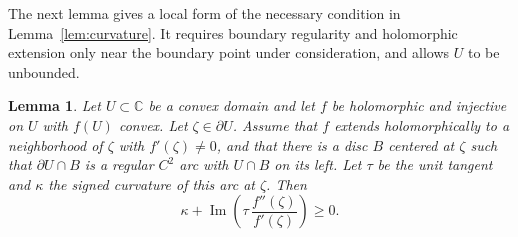\documentclass[a4paper, reqno, 11pt]{amsart}
\newtheorem{Lem}[Thm]{Lemma}
\theoremstyle{definition}
\begin{document}
The next lemma gives a local form of the necessary condition in Lemma~\ref{lem:curvature}. 
It requires boundary regularity and holomorphic extension only near the boundary point under consideration, and allows $U$ to be unbounded.

\begin{Lem}\label{lem:local}
Let $U \subset \mathbb{C}$ be a convex domain and let $f$ be holomorphic and injective on $U$ with $f(U)$ convex.
Let $\zeta \in \partial U$.
Assume that $f$ extends holomorphically to a neighborhood of $\zeta$ with $f'(\zeta) \neq 0$, and that there is a disc $B$ centered at $\zeta$ such that $\partial U \cap B$ is a regular $C^2$ arc with $U \cap B$ on its left.
Let $\tau$ be the unit tangent and $\kappa$ the signed curvature of this arc at $\zeta$.
Then
\begin{equation}\label{eq:local}
\kappa + \operatorname{Im}\left( \tau \, \frac{f''(\zeta)}{f'(\zeta)} \right) \ge  0 .
\end{equation}
\end{Lem}
\end{document}
